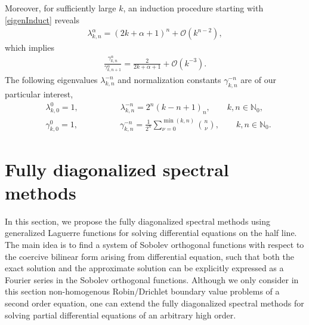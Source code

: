 \documentclass[10pt,reqno]{amsart}
\theoremstyle{remark}
\theoremstyle{definition}
\begin{document}
Moreover,  for sufficiently large $k$, an induction procedure starting with \eqref{eigenInduct} reveals
   \begin{align}
   \label{eigenEsti}
    \lambda^{\alpha}_{k,n}= (2k+\alpha+1)^n + \mathcal{O}(k^{n-2}),
   \end{align}
   which  implies
   \begin{align}
   \label{ratio}
 \frac{\gamma^{\alpha}_{k,n}}{\gamma^{\alpha}_{k,n+1}}  = \frac{2}{2k+\alpha+1}  + \mathcal{O}(k^{-3}).
 \end{align}
 The following eigenvalues $\lambda^{-n}_{k,n}$ and normalization constants $\gamma^{-n}_{k,n}$  are of our particular interest,
 \begin{align}
  \label{eigenExplcit}
  &\lambda^{0}_{k,0} = 1,\qquad \qquad\quad
\lambda^{-n}_{k,n} = 2^n (k-n+1)_n, \qquad k,n \in \mathbb{N}_0,
\\
\label{normExplicit}
& \gamma^{0}_{k,0} =1, \qquad \qquad\quad  \gamma^{-n}_{k,n}  = \frac{1}{2^n} \sum_{\nu=0}^{\min(k,n)} \binom{n}{\nu} ,\qquad      k,n \in \mathbb{N}_0.
 \end{align}

\section{Fully diagonalized spectral methods}\setcounter{equation}{0} \setcounter{lmm}{0} \setcounter{thm}{0}
In this section, we propose the fully diagonalized spectral methods
using generalized Laguerre functions for solving differential equations
on the half line. The main idea is to find a system of Sobolev orthogonal
functions \cite{FerMarPinXu,MarXu} with respect to the coercive bilinear form arising from differential equation,
such that both the exact solution and the approximate solution can be explicitly expressed
as a Fourier series in the Sobolev orthogonal
functions. Although we only consider in this section
non-homogenous  Robin/Drichlet boundary  value problems of a second order equation,
one can extend the  fully diagonalized spectral methods for solving partial  differential equations
of an arbitrary high order.
\end{document}
